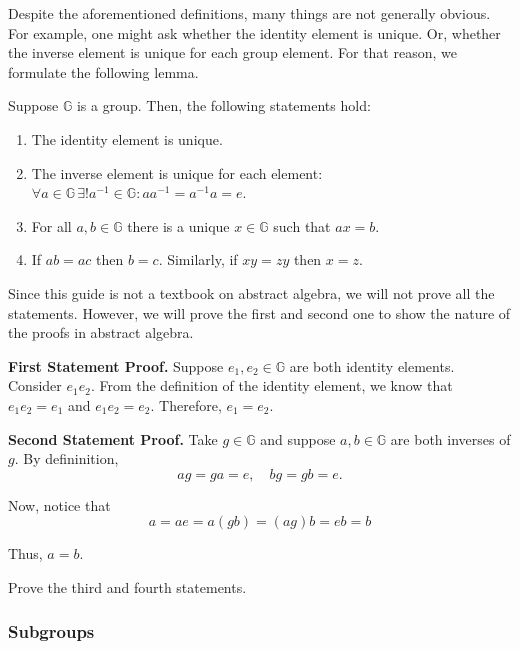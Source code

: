 \documentclass[../lecture-notes.tex]{subfiles}
\begin{document}
Despite the aforementioned definitions, many things are not generally obvious. For example, one might ask whether the identity element is unique. Or, 
whether the inverse element is unique for each group element. For that reason, we formulate the following lemma.

\begin{lemma}
    Suppose $\mathbb{G}$ is a group. Then, the following statements hold:
    \begin{enumerate}
        \item The identity element is unique.
        \item The inverse element is unique for each element: $\forall a \in \mathbb{G} \, \exists! a^{-1} \in \mathbb{G}: aa^{-1} = a^{-1}a = e$.
        \item For all $a,b \in \mathbb{G}$ there is a unique $x \in \mathbb{G}$ such that $ax = b$.
        \item If $ab=ac$ then $b=c$. Similarly, if $xy=zy$ then $x=z$.
    \end{enumerate}
\end{lemma}

Since this guide is not a textbook on abstract algebra, we will not prove all the statements. However, we will prove the first and second one to show the nature of the proofs in abstract algebra.

\textbf{First Statement Proof.} Suppose $e_1,e_2 \in \mathbb{G}$ are both identity elements. Consider $e_1e_2$. From the definition of the identity element, we know that $e_1e_2 = e_1$ and $e_1e_2 = e_2$. Therefore, $e_1 = e_2$.

\textbf{Second Statement Proof.} Take $g \in \mathbb{G}$ and suppose $a,b \in \mathbb{G}$ are both inverses of $g$. By defininition,
\begin{equation*}
    ag = ga = e, \quad bg = gb = e.
\end{equation*}

Now, notice that
\begin{equation*}
    a = ae = a (gb) = (a g) b = e b = b
\end{equation*}

Thus, $a = b$.

\begin{exercise}
    Prove the third and fourth statements.
\end{exercise}

\subsubsection{Subgroups}
\end{document}
